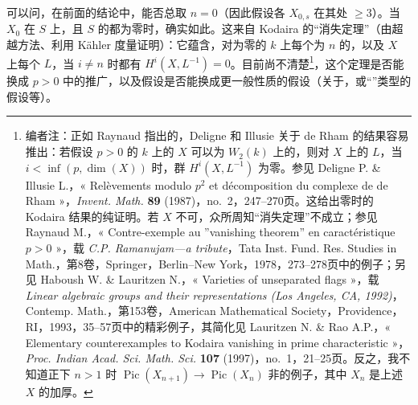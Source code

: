 可以问，在前面的结论中，能否总取 $n=0$（因此假设各 $X_{0,s}$ 在其处 $\geq3$）。当 $X_0$ 在 $S$ 上，且 $S$ 的都为零时，确实如此。这来自 Kodaira 的“消失定理”（由超越方法、利用 Kähler 度量证明）：它蕴含，对为零的 $k$ 上每个为 $n$ 的，以及 $X$ 上每个 $L$，当 $i\neq n$ 时都有 $H^i(X,L^{-1})=0$。目前尚不清楚\footnote{编者注：正如 Raynaud 指出的，Deligne 和 Illusie 关于 de Rham 的结果容易推出：若假设 $p>0$ 的 $k$ 上的 $X$ 可以为 $W_2(k)$ 上的，则对 $X$ 上的 $L$，当 $i<\inf(p,\dim(X))$ 时，群 $H^i(X,L^{-1})$ 为零。参见 Deligne P. \& Illusie L.，« Relèvements modulo $p^2$ et décomposition du complexe de de Rham »，\emph{Invent. Math.} \textbf{89} (1987)，no.~2，247--270页。这给出零时的 Kodaira 结果的纯证明。若 $X$ 不可，众所周知“消失定理”不成立；参见 Raynaud M.，« Contre-exemple au ”vanishing theorem” en caractéristique $p>0$ »，载 \emph{C.P. Ramanujam---a tribute}，Tata Inst. Fund. Res. Studies in Math.，第8卷，Springer，Berlin--New York，1978，273--278页中的例子；另见 Haboush W. \& Lauritzen N.，« Varieties of unseparated flags »，载 \emph{Linear algebraic groups and their representations (Los Angeles, CA, 1992)}，Contemp. Math.，第153卷，American Mathematical Society，Providence，RI，1993，35--57页中的精彩例子，其简化见 Lauritzen N. \& Rao A.P.，« Elementary counterexamples to Kodaira vanishing in prime characteristic »，\emph{Proc. Indian Acad. Sci. Math. Sci.} \textbf{107} (1997)，no.~1，21--25页。反之，我不知道正下 $n>1$ 时 $\operatorname{Pic}(X_{n+1})\to\operatorname{Pic}(X_n)$ 非的例子，其中 $X_n$ 是上述 $X$ 的加厚。}，这个定理是否能换成 $p>0$ 中的推广，以及假设是否能换成更一般性质的假设（关于，或“”类型的假设等）。

